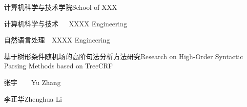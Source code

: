
\school
{计算机科学与技术学院}{School of XXX}

\major
{计算机科学与技术~~~}{XXXX Engineering}

\direct
{自然语言处理~~}{XXXX Engineering}

\thesistitle
{基于树形条件随机场的高阶句法分析方法研究}{Research on High-Order Syntactic Parsing Methods based on TreeCRF}

\thesisauthor
{张宇~~~~}{Yu Zhang}

\teacher
{李正华}{Zhenghua Li}





